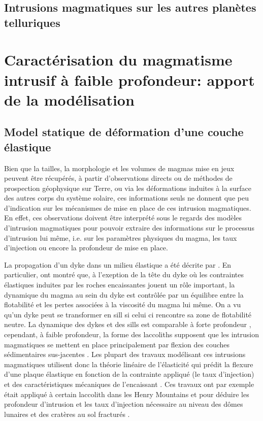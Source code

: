 \subsection{Intrusions   magmatiques    sur   les    autres   planètes
  telluriques}
\label{}


\section{Caractérisation du  magmatisme intrusif à  faible profondeur:
  apport de la modélisation}
\label{sec:orign-theor-fram}

\subsection{Model statique de déformation d'une couche élastique}
\label{sec:model-statique-de}

Bien que la  tailles, la morphologie et les volumes  de magmas mise en
jeux peuvent  être récupérés,  à partir  d'observations directs  ou de
méthodes de prospection géophysique sur Terre, ou via les déformations
induites  à  la surface  des  autres  corps  du système  solaire,  ces
informations seuls ne donnent que  peu d'indication sur les mécanismes
de  mise  en  place  de  ces intrusion  magmatiques.   En  effet,  ces
observations  doivent  être interprété  sous  le  regards des  modèles
d'intrusion magmatiques pour pouvoir  extraire des informations sur le
processus d'intrusion lui même, i.e.   sur les paramètres physiques du
magma, les taux d'injection ou encore la profondeur de mise en place.

La propagation  d'un dyke dans un  milieu élastique a été  décrite par
\citep{Lister:1991ut,Rubin:1995upa}.           En         particulier,
\citet{Lister:1990hz} ont montré que, à  l'exeption de la tête du dyke
où  les contraintes  élastiques induites  par les  roches encaissantes
jouent un  rôle important, la dynamique  du magma au sein  du dyke est
contrôlée  par  un  équilibre  entre  la  flotabilité  et  les  pertes
associées à la viscosité du magma lui même. On a vu qu'un dyke peut se
transformer  en sill  si celui  ci  rencontre sa  zone de  flotabilité
neutre. La  dynamique des dykes  et des  sills est comparable  à forte
profondeur   \citep{Lister:1991ut,Cruden:tg},   cependant,  à   faible
profondeur,  la  forme  des  laccoliths supposent  que  les  intrusion
magmatiques se mettent en place principalement par flexion des couches
sédimentaires  sus-jacentes \citep{Johnson:1973ho}.   Les plupart  des
travaux  modélisant  ces  intrusions  magmatiques  utilisent  donc  la
théorie linéaire  de l'élasticité qui  prédit la flexure  d'une plaque
élastique en fonction de la  contrainte appliqué (le taux d'injection)
et     des     caractéristiques     mécaniques     de     l'encaissant
\citep{Pollard:1973ho,Koch:1981if}. Ces travaux  ont par exemple était
appliqué à certain laccolith dans  les Henry Mountains et pour déduire
les  profondeur  d'intrusion et  les  taux  d'injection nécessaire  au
niveau des dômes lunaires \citep{Wohler:2007it} et des cratères au sol
fracturés \citep{Jozwiak:2012dq}.

